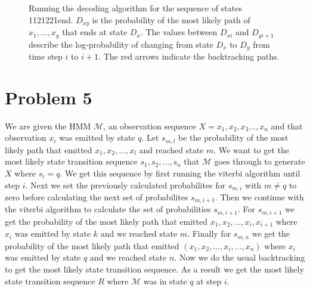 \documentclass[a4paper]{article}
\begin{document}
\begin{center}
\begin{figure}[!htp]
{
}
\caption{Running the decoding algorithm for the sequence of states 1121221end. $D_{xy}$ is the probability of the most likely path of $x_1,\hdots,x_y$ that ends at state $D_x$. The values between $D_{xi}$ and $D_{yi+1}$ describe the log-probability of changing from state $D_x$ to $D_y$ from time step $i$ to $i+1$. The red arrows indicate the backtracking paths.}



\end{figure}

\end{center}

\section{Problem 5}
We are given the HMM $\mathcal{M}$, an observation sequence $X=x_1,x_2,x_3\hdots,x_n$ and that observation $x_i$ was emitted by state $q$. Let $s_{m,l}$ be the probability of the most likely path that emitted $x_1,x_2,\hdots,x_l$ and reached state $m$. We want to get the most likely state transition sequence $s_1,s_2,\hdots,s_n$ that $\mathcal{M}$ goes through to generate $X$ where $s_i=q$. We get this sequence by first running the viterbi algorithm until step $i$. Next we set the previously calculated probabilites for $s_{m,i}$ with $m\neq q$ to zero before calculating the next set of probabilites $s_{m,i+1}$. Then we continue with the viterbi algorithm to calculate the set of probabilities $s_{m,i+1}$. For $s_{m,i+1}$ we get the probability of the most likely path that emitted $x_1,x_2,\hdots,x_i,x_{i+1}$ where $x_i$ was emitted by state $k$ and we reached state $m$. Finally for $s_{m,n}$ we get the probability of the most likely path that emitted $(x_1,x_2,\hdots,x_i,\hdots,x_n)$ where $x_i$ was emitted by state $q$ and we reached state $n$. Now we do the usual backtracking to get the most likely state transition sequence. As a result we get the most likely state transition sequence $R$ where $\mathcal{M}$ was in state $q$ at step $i$.
\end{document}
